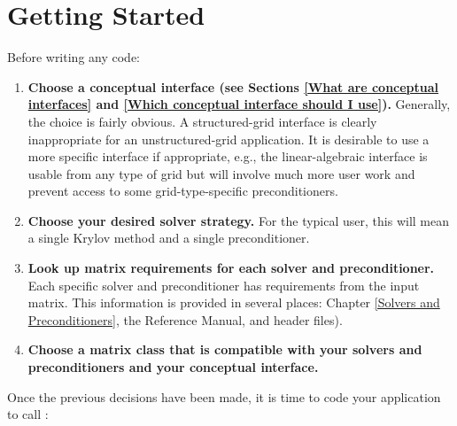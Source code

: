 

\chapter{Getting Started}
\label{Getting Started}

Before writing any code:

\begin{enumerate}

\item
{\bf Choose a conceptual interface (see Sections
\ref{What are conceptual interfaces} and
\ref{Which conceptual interface should I use}).}
Generally, the choice is fairly obvious.  A structured-grid interface
is clearly inappropriate for an unstructured-grid application.  It is
desirable to use a more specific interface if appropriate, e.g., the
linear-algebraic interface is usable from any type of grid but will
involve much more user work and prevent access to some
grid-type-specific preconditioners.

\item 
{\bf Choose your desired solver strategy. } For the typical user, this
will mean a single Krylov method and a single preconditioner.

\item 
{\bf Look up matrix requirements for each solver and preconditioner.}
Each specific solver and preconditioner has requirements from the
input matrix. This information is provided in several places: Chapter
\ref{Solvers and Preconditioners}, the \hypre{} Reference Manual, and
\hypre{} header files).

\item 
{\bf Choose a matrix class that is compatible with your solvers and
preconditioners and your conceptual interface.}

\end{enumerate}
Once the previous decisions have been made, it is time to code your
application to call \hypre{}:
